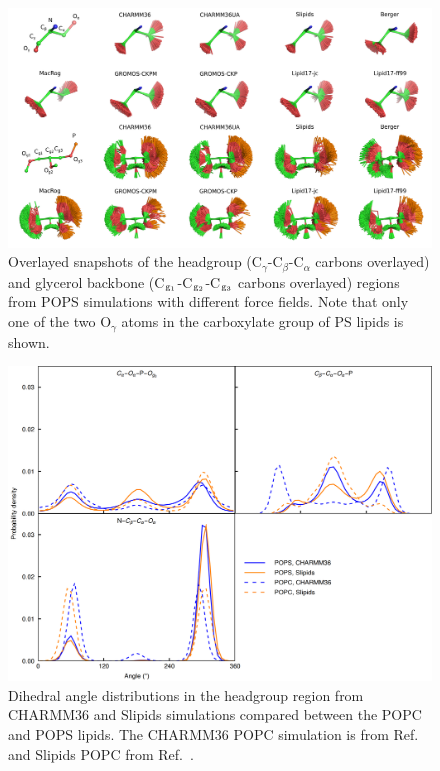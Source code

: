 \documentclass[journal=jpcbfk,manuscript=article]{achemso}
\begin{document}
\begin{figure}[]
  \centering
  \includegraphics[width=1.03\textwidth]{../Figs/figS8.png}
  \caption{\label{HGandGLYstructuresPS}
    Overlayed snapshots of the headgroup (C$_\gamma$-C$_\beta$-C$_\alpha$ carbons overlayed) and
    glycerol backbone (C$_{\rm g_1}$-C$_{\rm g_2}$-C$_{\rm g_3}$ carbons overlayed) regions from POPS simulations with different force fields.
    Note that only one of the two O$_\gamma$ atoms in the carboxylate group of PS lipids is shown.
  }
\end{figure}

\begin{figure}[]
  \centering
  \includegraphics[width=\textwidth]{../Figs/figS11.png}
  \caption{\label{dihedralsHGpc}
    Dihedral angle distributions in the headgroup region from CHARMM36 and Slipids simulations
    compared between the POPC and POPS lipids. 
    The CHARMM36 POPC simulation is from Ref.~ and Slipids POPC from Ref.~.
  }
\end{figure}
\end{document}
